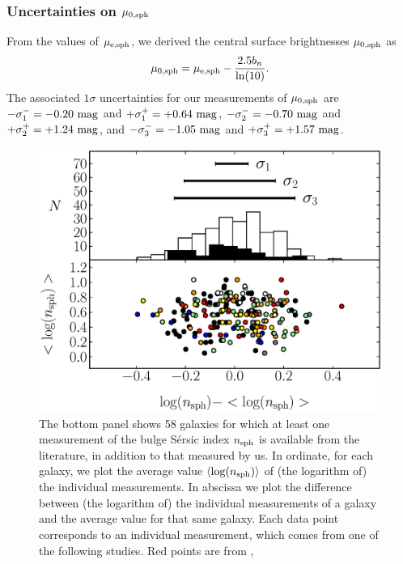 \documentclass[preprint2]{emulateapj}
\begin{document}
\subsubsection{Uncertainties on $\mu_{\rm 0,sph}$}
From the values of $\mu_{\rm e,sph}$, we derived the central surface brightnesses $\mu_{\rm 0,sph}$ as
\begin{equation}
\mu_{\rm 0,sph} = \mu_{\rm e,sph} - \frac{2.5 b_n}{\ln(10)}.
\end{equation}
The associated $1\sigma$ uncertainties for our measurements of $\mu_{\rm 0,sph}$ are 
$-\sigma_1^- = -0.20~\rm mag$ and $+\sigma_1^+ = +0.64~\rm mag$, 
$-\sigma_2^- = -0.70~\rm mag$ and $+\sigma_2^+ = +1.24~\rm mag$,
and $-\sigma_3^- = -1.05~\rm mag$ and $+\sigma_3^+ = +1.57~\rm mag$. 




\begin{figure}%
\begin{center}
\includegraphics[width=1.1\columnwidth]{images/comparison_all_n.eps} 
\caption{The bottom panel shows 58 galaxies for which at least one measurement of the bulge S\'ersic index $n_{\rm sph}$ is available 
from the literature, in addition to that measured by us.
In ordinate, for each galaxy, we plot the average value $\langle \log(n_{\rm sph}) \rangle$ of (the logarithm of) the individual measurements. 
In abscissa we plot the difference between (the logarithm of) the individual measurements of a galaxy 
and the average value for that same galaxy.
Each data point corresponds to an individual measurement, 
which comes from one of the following studies. 
Red points are from \cite{grahamdriver2007}, 
}
\end{center}
\end{figure}
\end{document}
